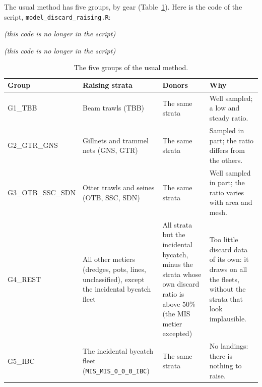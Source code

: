 \documentclass[
  a4paper,
  DIV=11,
  numbers=noendperiod]{scrartcl}
\begin{document}
The usual method has five groups, by gear
(Table~\ref{tbl-groups-usual}). Here is the code of the script,
\texttt{model\_discard\_raising.R}:

\emph{(this code is no longer in the script)}

\emph{(this code is no longer in the script)}

\begin{longtable}[]{@{}
  >{\raggedright\arraybackslash}p{}
  >{\raggedright\arraybackslash}p{}
  >{\raggedright\arraybackslash}p{}
  >{\raggedright\arraybackslash}p{}@{}}

\caption{\label{tbl-groups-usual}The five groups of the usual method.}

\tabularnewline

\toprule\noalign{}
\begin{minipage}[b]{\linewidth}\raggedright
Group
\end{minipage} & \begin{minipage}[b]{\linewidth}\raggedright
Raising strata
\end{minipage} & \begin{minipage}[b]{\linewidth}\raggedright
Donors
\end{minipage} & \begin{minipage}[b]{\linewidth}\raggedright
Why
\end{minipage} \\
\midrule\noalign{}
\endhead
\bottomrule\noalign{}
\endlastfoot
G1\_TBB & Beam trawls (TBB) & The same strata & Well sampled; a low and
steady ratio. \\
G2\_GTR\_GNS & Gillnets and trammel nets (GNS, GTR) & The same strata &
Sampled in part; the ratio differs from the others. \\
G3\_OTB\_SSC\_SDN & Otter trawls and seines (OTB, SSC, SDN) & The same
strata & Well sampled in part; the ratio varies with area and mesh. \\
G4\_REST & All other metiers (dredges, pots, lines, unclassified),
except the incidental bycatch fleet & All strata but the incidental
bycatch, minus the strata whose own discard ratio is above 50\% (the MIS
metier excepted) & Too little discard data of its own: it draws on all
the fleets, without the strata that look implausible. \\
G5\_IBC & The incidental bycatch fleet (\texttt{MIS\_MIS\_0\_0\_0\_IBC})
& The same strata & No landings: there is nothing to raise. \\

\end{longtable}
\end{document}
